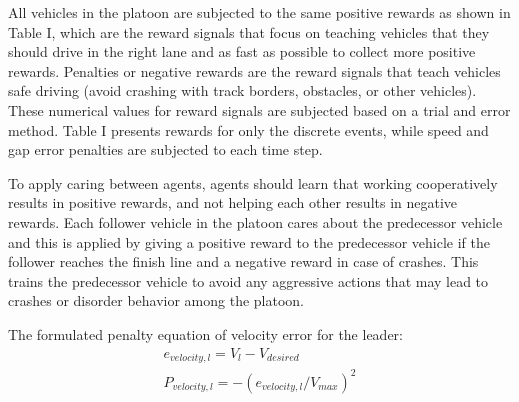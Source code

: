 All vehicles in the platoon are subjected to the same positive rewards as shown in Table I, which are the reward signals that focus on teaching vehicles that they should drive in the right lane and as fast as possible to collect more positive rewards. Penalties or negative rewards are the reward signals that teach vehicles safe driving (avoid crashing with track borders, obstacles, or other vehicles). These numerical values for reward signals are subjected based on a trial and error method.
Table I presents rewards for only the discrete events, while speed and gap error penalties are subjected to each time step.

\begin{table}[H]
\centering
\caption{Reward Signals for Discrete Events} 
\end{table}

To apply caring between agents, agents should learn that working cooperatively results in positive rewards, and not helping each other results in negative rewards. Each follower vehicle in the platoon cares about the predecessor vehicle and this is applied by giving a positive reward to the predecessor vehicle if the follower reaches the finish line and a negative reward in case of crashes. This trains the predecessor vehicle to avoid any aggressive actions that may lead to crashes or disorder behavior among the platoon.

The formulated penalty equation of velocity error for the leader:
\begin{gather}
e_{velocity,l} = V_l - V_{desired} \\
P_{velocity,l} = -(e_{velocity,l}/V_{max})^2
\end{gather}  


